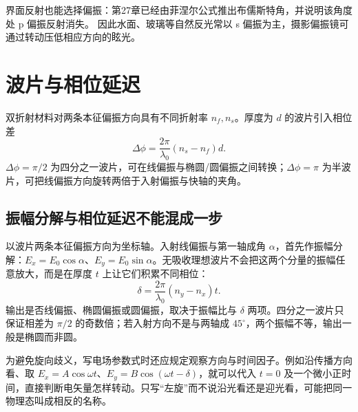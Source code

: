 界面反射也能选择偏振：第27章已经由菲涅尔公式推出布儒斯特角，并说明该角度处 p 偏振反射消失。
因此水面、玻璃等自然反光常以 s 偏振为主，摄影偏振镜可通过转动压低相应方向的眩光。



\section{波片与相位延迟}



双折射材料对两条本征偏振方向具有不同折射率 $n_f,n_s$。厚度为 $d$ 的波片引入相位差
\begin{equation}
 \Delta\phi=\frac{2\pi}{\lambda_0}(n_s-n_f)d.
\end{equation}
$\Delta\phi=\pi/2$ 为四分之一波片，可在线偏振与椭圆/圆偏振之间转换；$\Delta\phi=\pi$ 为半波片，可把线偏振方向旋转两倍于入射偏振与快轴的夹角。


\subsection{振幅分解与相位延迟不能混成一步}
以波片两条本征偏振方向为坐标轴。入射线偏振与第一轴成角 $\alpha$，首先作振幅分解：$E_x=E_0\cos\alpha$、$E_y=E_0\sin\alpha$。无吸收理想波片不会把这两个分量的振幅任意放大，而是在厚度 $t$ 上让它们积累不同相位：
\[
 \delta=\frac{2\pi}{\lambda_0}(n_y-n_x)t.
\]
输出是否线偏振、椭圆偏振或圆偏振，取决于振幅比与 $\delta$ 两项。四分之一波片只保证相差为 $\pi/2$ 的奇数倍；若入射方向不是与两轴成 $45^\circ$，两个振幅不等，输出一般是椭圆而非圆。

为避免旋向歧义，写电场参数式时还应规定观察方向与时间因子。例如沿传播方向看、取
$E_x=A\cos\omega t$、$E_y=B\cos(\omega t-\delta)$，就可以代入 $t=0$ 及一个微小正时间，直接判断电矢量怎样转动。只写“左旋”而不说沿光看还是迎光看，可能把同一物理态叫成相反的名称。

